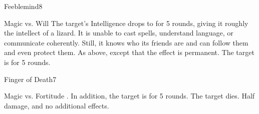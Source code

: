 \begin{spellsection}{Feeblemind}{8}
\begin{spellheader}
\end{spellheader}
\begin{spellcontent}
    \begin{spelltargetinginfo}
    \end{spelltargetinginfo}
    \begin{spelleffects}
        \begin{spellattack}{Magic vs. Will}
            \spellsuccess The target's Intelligence drops to  for 5 rounds, giving it roughly the intellect of a lizard. It is unable to cast spells, understand language, or communicate coherently. Still, it knows who its friends are and can follow them and even protect them.
            \spellcritical As above, except that the effect is permanent.
            \spellfailure The target is \dazed for 5 rounds.
        \end{spellattack}
    \end{spelleffects}
\end{spellcontent}
\begin{spellfooter}
\end{spellfooter}
\end{spellsection}

\begin{spellsection}{Finger of Death}{7}
\begin{spellheader}
\end{spellheader}
\begin{spellcontent}
    \begin{spelltargetinginfo}
    \end{spelltargetinginfo}
    \begin{spelleffects}
        \begin{spellattack}{Magic vs. Fortitude}
            \spellsuccess {}. In addition, the target is \staggered for 5 rounds.
            \spellcritical The target dies.
            \spellfailure Half damage, and no additional effects.
        \end{spellattack}
    \end{spelleffects}
\end{spellcontent}
\begin{spellfooter}
\end{spellfooter}
\end{spellsection}

